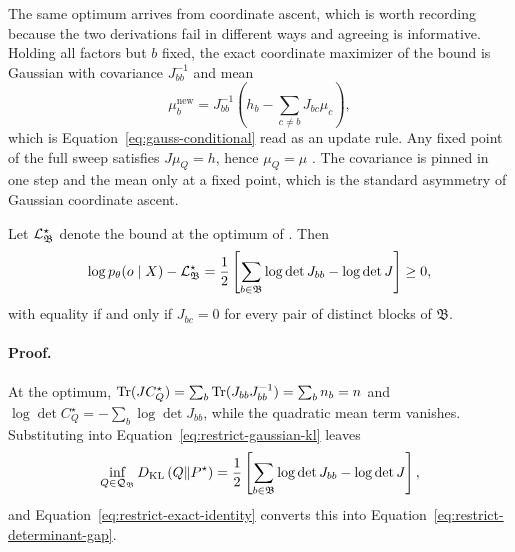 The same optimum arrives from coordinate ascent, which is worth recording because the two derivations fail in different ways and agreeing is informative. Holding all factors but $b$ fixed, the exact coordinate maximizer of the bound is Gaussian with covariance $J_{bb}^{-1}$ and mean
\begin{equation}
\mu_b^{\mathrm{new}}
=J_{bb}^{-1}\left(h_b-\sum_{c\neq b}J_{bc}\mu_c\right),
\label{eq:restrict-cavi-mean}
\end{equation}
which is Equation~\eqref{eq:gauss-conditional} read as an update rule. Any fixed point of the full sweep satisfies $J\mu_Q=h$, hence $\mu_Q=\mu$ \citep{Bishop2006,Blei2017}. The covariance is pinned in one step and the mean only at a fixed point, which is the standard asymmetry of Gaussian coordinate ascent.

Let $\mathcal L^\star_{\mathfrak B}$ denote the bound at the optimum of . Then
\begin{equation}
\log p_\theta(o\mid X)-\mathcal L^\star_{\mathfrak B}
=\frac12\left[\sum_{b\in\mathfrak B}\log\det J_{bb}-\log\det J\right]
\geq0,
\label{eq:restrict-determinant-gap}
\end{equation}
with equality if and only if $J_{bc}=0$ for every pair of distinct blocks of $\mathfrak B$. 

\paragraph{Proof.}
At the optimum, $\operatorname{Tr}(JC_Q^\star)=\sum_b\operatorname{Tr}(J_{bb}J_{bb}^{-1})=\sum_bn_b=n$ and $\log\det C_Q^\star=-\sum_b\log\det J_{bb}$, while the quadratic mean term vanishes. Substituting into Equation~\eqref{eq:restrict-gaussian-kl} leaves
\begin{equation}
\inf_{Q\in\mathcal Q_{\mathfrak B}}D_{\mathrm{KL}}\left(Q\Vert P^\star\right)
=\frac12\left[\sum_{b\in\mathfrak B}\log\det J_{bb}-\log\det J\right],
\label{eq:restrict-block-min-kl}
\end{equation}
and Equation~\eqref{eq:restrict-exact-identity} converts this into Equation~\eqref{eq:restrict-determinant-gap}.

